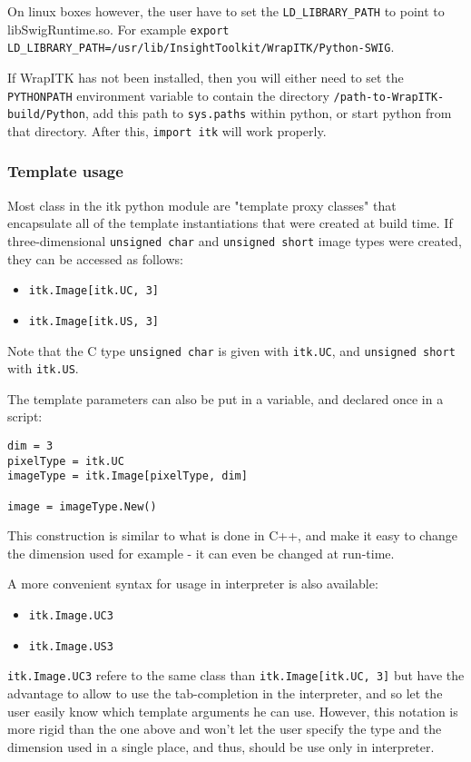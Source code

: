 \documentclass{InsightArticle}
\begin{document}
On linux boxes however, the user have to set the \verb$LD_LIBRARY_PATH$ to
point to libSwigRuntime.so. For example
\verb$export LD_LIBRARY_PATH=/usr/lib/InsightToolkit/WrapITK/Python-SWIG$.

If WrapITK has not been installed, then you will either need to set the
\verb$PYTHONPATH$ environment variable to contain the directory
\verb$/path-to-WrapITK-build/Python$, add  this path to \verb$sys.paths$ within python, or
start python from that directory. After this, \verb$import itk$ will work
properly.

     \subsubsection{Template usage}
Most class in the itk python module are "template proxy classes" that
encapsulate all of the template instantiations that were created at build time.
If three-dimensional \verb$unsigned char$ and \verb$unsigned short$ image types were created,
they can be accessed as follows:
\begin{itemize}
  \item \verb$itk.Image[itk.UC, 3]$
  \item \verb$itk.Image[itk.US, 3]$
\end{itemize}
Note that the C type \verb$unsigned char$ is given with \verb$itk.UC$, and \verb$unsigned short$
with \verb$itk.US$.

The template parameters can also be put in a variable, and declared once
in a script:
\begin{verbatim}
dim = 3
pixelType = itk.UC
imageType = itk.Image[pixelType, dim]

image = imageType.New()
\end{verbatim}
This construction is similar to what is done in C++, and make it easy to change
the dimension used for example - it can even be changed at run-time.

A more convenient syntax for usage in interpreter is also available:
\begin{itemize}
  \item \verb$itk.Image.UC3$
  \item \verb$itk.Image.US3$
\end{itemize}
\verb$itk.Image.UC3$ refere to the same class than \verb$itk.Image[itk.UC, 3]$
but have the advantage to allow to use the tab-completion in the interpreter,
and so let the user easily know which template arguments he can use.
However, this notation is more rigid than the one above and won't let the user
specify the type and the dimension used in a single place, and thus,
should be use only in interpreter.
\end{document}

